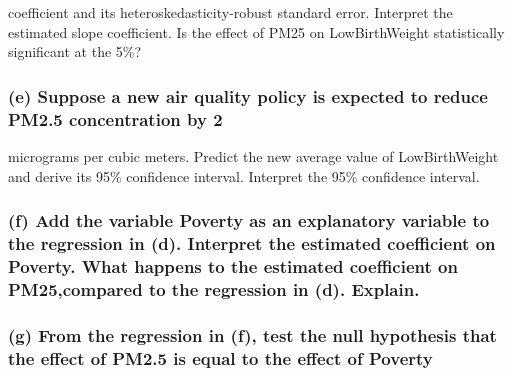 \documentclass[
]{article}
\begin{document}
coefficient and its heteroskedasticity-robust standard error. Interpret
the estimated slope coefficient. Is the effect of PM25 on LowBirthWeight
statistically significant at the 5\%?

\hypertarget{e-suppose-a-new-air-quality-policy-is-expected-to-reduce-pm2.5-concentration-by-2}{%
\subsubsection{(e) Suppose a new air quality policy is expected to
reduce PM2.5 concentration by
2}\label{e-suppose-a-new-air-quality-policy-is-expected-to-reduce-pm2.5-concentration-by-2}}

micrograms per cubic meters. Predict the new average value of
LowBirthWeight and derive its 95\% confidence interval. Interpret the
95\% confidence interval.

\hypertarget{f-add-the-variable-poverty-as-an-explanatory-variable-to-the-regression-in-d.-interpret-the-estimated-coefficient-on-poverty.-what-happens-to-the-estimated-coefficient-on-pm25compared-to-the-regression-in-d.-explain.}{%
\subsubsection{(f) Add the variable Poverty as an explanatory variable
to the regression in (d). Interpret the estimated coefficient on
Poverty. What happens to the estimated coefficient on PM25,compared to
the regression in (d).
Explain.}\label{f-add-the-variable-poverty-as-an-explanatory-variable-to-the-regression-in-d.-interpret-the-estimated-coefficient-on-poverty.-what-happens-to-the-estimated-coefficient-on-pm25compared-to-the-regression-in-d.-explain.}}

\hypertarget{g-from-the-regression-in-f-test-the-null-hypothesis-that-the-effect-of-pm2.5-is-equal-to-the-effect-of-poverty}{%
\subsubsection{(g) From the regression in (f), test the null hypothesis
that the effect of PM2.5 is equal to the effect of
Poverty}\label{g-from-the-regression-in-f-test-the-null-hypothesis-that-the-effect-of-pm2.5-is-equal-to-the-effect-of-poverty}}
\end{document}
